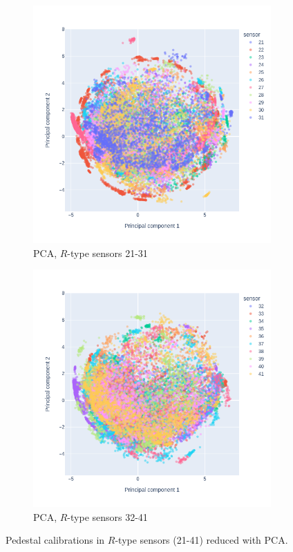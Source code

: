 \begin{figure}
\centering
  \begin{subfigure}[b]{0.7\textwidth}
    \centering
    \includegraphics[width=\linewidth]{figures/chapter4/dimred/PCA_pedestals_r_phi_2.png}
    \caption{PCA, $R$-type sensors 21-31}
    \label{plot:PCA_pedestals_2}
  \end{subfigure}
  \begin{subfigure}[b]{0.7\textwidth}
    \centering
    \includegraphics[width=\linewidth]{figures/chapter4/dimred/PCA_pedestals_r_phi_3.png}
    \caption{PCA, $R$-type sensors 32-41}
    \label{plot:PCA_pedestals_3}
  \end{subfigure}

\caption[All calibrationb]{Pedestal calibrations in $R$-type sensors (21-41) reduced with PCA.}
\label{plot:pca_all_ped}
\end{figure}
